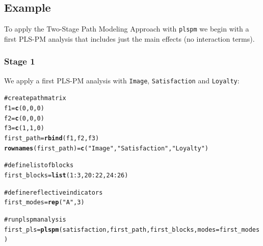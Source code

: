 \documentclass[12pt]{book}\usepackage{graphicx, color}
\makeatletter
\newcommand{\hlfunctioncall}[1]{\textcolor[rgb]{0.501960784313725,0,0.329411764705882}{\textbf{#1}}}%
\newcommand{\hlstring}[1]{\textcolor[rgb]{0.6,0.6,1}{#1}}%
\newcommand{\hlcomment}[1]{\textcolor[rgb]{0.180392156862745,0.6,0.341176470588235}{#1}}%
\newenvironment{kframe}{%
 \def\at@end@of@kframe{}%
 \ifinner\ifhmode%
  \def\at@end@of@kframe{\end{minipage}}%
  \begin{minipage}{\columnwidth}%
 \fi\fi%
 \def\FrameCommand##1{\hskip\@totalleftmargin \hskip-\fboxsep
 \colorbox{shadecolor}{##1}\hskip-\fboxsep
     \hskip-\linewidth \hskip-\@totalleftmargin \hskip\columnwidth}%
 \MakeFramed {\advance\hsize-\width
   \@totalleftmargin\z@ \linewidth\hsize
   \@setminipage}}%
 {\par\unskip\endMakeFramed%
 \at@end@of@kframe}
\newenvironment{knitrout}{}{} %
\newcommand{\plspm}{\texttt{plspm}}
\newcommand{\code}[1]{\texttt{#1}}
\makeatother
\begin{document}
\subsection{Example}
To apply the Two-Stage Path Modeling Approach with \plspm{} we begin with a first PLS-PM analysis that includes just the main effects (no interaction terms).


\subsubsection*{Stage 1}
We apply a first PLS-PM analysis with \code{Image}, \code{Satisfaction} and \code{Loyalty}:
\begin{knitrout}
\color{fgcolor}\begin{kframe}
\begin{alltt}
\hlcomment{# create path matrix}
f1 = \hlfunctioncall{c}(0, 0, 0)
f2 = \hlfunctioncall{c}(0, 0, 0)
f3 = \hlfunctioncall{c}(1, 1, 0)
first_path = \hlfunctioncall{rbind}(f1, f2, f3)
\hlfunctioncall{rownames}(first_path) = \hlfunctioncall{c}(\hlstring{"Image"}, \hlstring{"Satisfaction"}, \hlstring{"Loyalty"})

\hlcomment{# define list of blocks}
first_blocks = \hlfunctioncall{list}(1:3, 20:22, 24:26)

\hlcomment{# define reflective indicators}
first_modes = \hlfunctioncall{rep}(\hlstring{"A"}, 3)

\hlcomment{# run plspm analysis}
first_pls = \hlfunctioncall{plspm}(satisfaction, first_path, first_blocks, modes = first_modes)
\end{alltt}
\end{kframe}
\end{knitrout}
\end{document}
